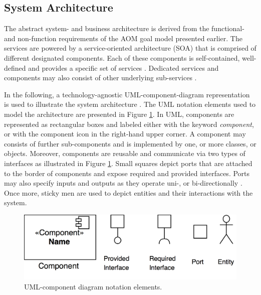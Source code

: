\documentclass{llncs}
\begin{document}
{		\subsection{System Architecture}
			\label{ss:component-diagrams}

			The abstract system- and business architecture is derived from the functional- and non-function requirements of the AOM goal model presented earlier. The services are powered by a service-oriented architecture (SOA) that is comprised of different designated components. Each of these components is self-contained, well-defined and provides a specific set of services \cite{erl2005service}\cite{perrey2003service}. Dedicated services and components may also consist of other underlying sub-services \cite{rosen2012applied}. 
			
			In the following, a technology-agnostic UML-component-diagram representation is used to illustrate the system architecture \cite{booch1996unified}\cite{specification2007omg}. The UML notation elements used to model the architecture are presented in Figure \ref{fig:uml-component-diagram-overview}. In UML, components are represented as rectangular boxes and labeled either with the keyword \textit{component}, or with the component icon in the right-hand upper corner. A component may consists of further sub-components and is implemented by one, or more classes, or objects. Moreover, components are reusable and communicate via two types of interfaces as illustrated in Figure \ref{fig:uml-component-diagram-overview}. Small squares depict ports that are attached to the border of components and expose required and provided interfaces. Ports may also specify inputs and outputs as they operate uni-, or bi-directionally \cite{booch1996unified}\cite{specification2007omg}. Once more, sticky men are used to depict entities and their interactions with the system. 
			
			\begin{figure}
				\centering
				\includegraphics[scale=0.12]{Figures/UML-notation-elements.png}
				\caption{UML-component diagram notation elements.}	
				\label{fig:uml-component-diagram-overview}
			\end{figure}	
			
}
\end{document}
